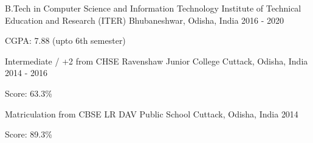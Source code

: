 

\begin{cventries}

  \cventry
    {B.Tech in Computer Science and Information Technology} %
    {Institute of Technical Education and Research (ITER)} %
    {Bhubaneshwar, Odisha, India} %
    {2016 - 2020} %
    {
      \begin{cvitems} %
        \item {CGPA: 7.88 (upto 6th semester)}
      \end{cvitems}
    }


\cventry
    {Intermediate / +2 from CHSE} %
    {Ravenshaw Junior College} %
    {Cuttack, Odisha, India} %
    {2014 - 2016} %
    {
      \begin{cvitems} %
        \item {Score: 63.3\%}
      \end{cvitems}
    }


\cventry
    {Matriculation from CBSE} %
    {LR DAV Public School} %
    {Cuttack, Odisha, India} %
    {2014} %
    {
      \begin{cvitems} %
        \item {Score: 89.3\%}
      \end{cvitems}
    }

\end{cventries}
